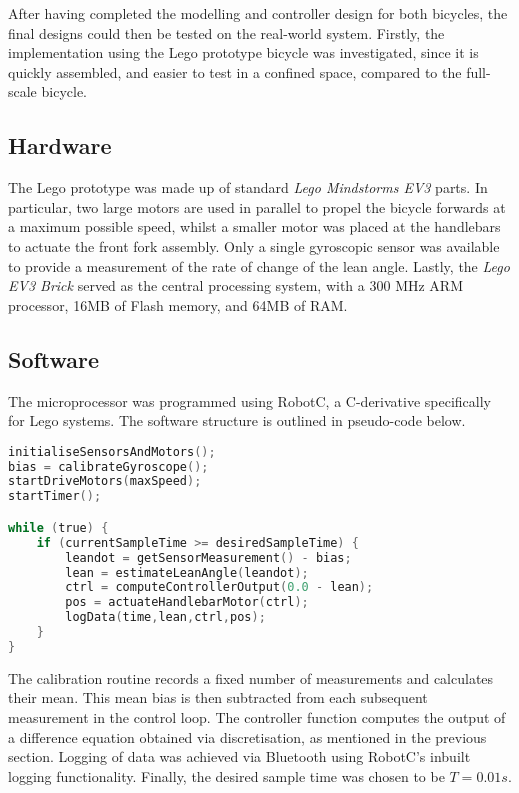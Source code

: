 After having completed the modelling and controller design for both bicycles, the final designs could then be tested on the real-world system. Firstly, the implementation using the Lego prototype bicycle was investigated, since it is quickly assembled, and easier to test in a confined space, compared to the full-scale bicycle.

\subsection{Hardware}
The Lego prototype was made up of standard \textit{Lego Mindstorms EV3} parts. In particular, two large motors are used in parallel to propel the bicycle forwards at a maximum possible speed, whilst a smaller motor was placed at the handlebars to actuate the front fork assembly. Only a single gyroscopic sensor was available to provide a measurement of the rate of change of the lean angle. Lastly, the \textit{Lego EV3 Brick} served as the central processing system, with a 300 MHz ARM processor, 16MB of Flash memory, and 64MB of RAM.

\subsection{Software}
The microprocessor was programmed using RobotC, a C-derivative specifically for Lego systems. The software structure is outlined in pseudo-code below.

\begin{lstlisting}[language=C, caption=Lego Software Pseudo-Code]
initialiseSensorsAndMotors();
bias = calibrateGyroscope();
startDriveMotors(maxSpeed);
startTimer();

while (true) {
	if (currentSampleTime >= desiredSampleTime) {
		leandot = getSensorMeasurement() - bias;
		lean = estimateLeanAngle(leandot);
		ctrl = computeControllerOutput(0.0 - lean);
		pos = actuateHandlebarMotor(ctrl);
		logData(time,lean,ctrl,pos);
	}
}
\end{lstlisting}

The calibration routine records a fixed number of measurements and calculates their mean. This mean bias is then subtracted from each subsequent measurement in the control loop. The controller function computes the output of a difference equation obtained via discretisation, as mentioned in the previous section. Logging of data was achieved via Bluetooth using RobotC's inbuilt logging functionality. Finally, the desired sample time was chosen to be $T=0.01s$.

